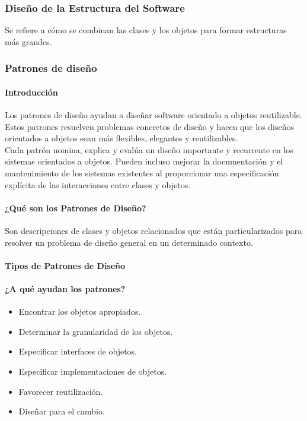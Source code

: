 \subsubsection{Diseño de la Estructura del Software}
Se refiere a cómo se combinan las clases y los objetos para formar estructuras más grandes.
\subsubsection{Patrones de diseño}
\paragraph{Introducción}
Los patrones de diseño ayudan a diseñar software orientado a objetos reutilizable. Estos patrones resuelven problemas concretos de diseño y hacen que los diseños orientados a objetos sean más flexibles, elegantes y reutilizables.\\
Cada patrón nomina, explica y evalúa un diseño importante y recurrente en los sistemas orientados a objetos. Pueden incluso mejorar la documentación y el mantenimiento de los sistemas existentes al proporcionar una especificación explícita de las interacciones entre clases y objetos.
\paragraph{¿Qué son los Patrones de Diseño?}
Son descripciones de clases y objetos relacionados que están particularizados para resolver un problema de diseño general en un determinado contexto.
\paragraph{Tipos de Patrones de Diseño}
\paragraph{¿A qué ayudan los patrones?}
\begin{itemize}
\item Encontrar los objetos apropiados.
\item Determinar la granularidad de los objetos.
\item Especificar interfaces de objetos.
\item Especificar implementaciones de objetos.
\item Favorecer reutilización.
\item Diseñar para el cambio.
\end{itemize}

